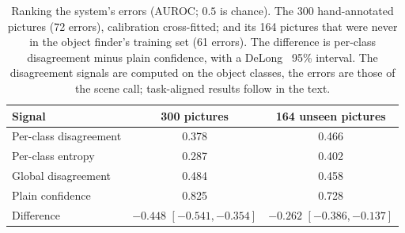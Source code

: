 \begin{table}[!htbp]
\centering
\caption[Disagreement against confidence: the pre-registered test]{Ranking the system's errors (AUROC; $0.5$ is chance). The 300 hand-annotated pictures (72 errors), calibration cross-fitted; and its 164 pictures that were never in the object finder's training set (61 errors). The difference is per-class disagreement minus plain confidence, with a DeLong~\cite{delong1988} 95\% interval. The disagreement signals are computed on the object classes, the errors are those of the scene call; task-aligned results follow in the text.}
\label{tab:c4_preregistered}
\begin{tabular}{lcc}
\toprule
Signal & 300 pictures & 164 unseen pictures \\
\midrule
Per-class disagreement & 0.378 & 0.466 \\
Per-class entropy & 0.287 & 0.402 \\
Global disagreement & 0.484 & 0.458 \\
Plain confidence & 0.825 & 0.728 \\
\midrule
Difference & $-0.448$ $[-0.541, -0.354]$ & $-0.262$ $[-0.386, -0.137]$ \\
\bottomrule
\end{tabular}
\end{table}

